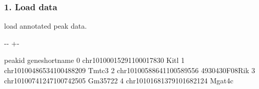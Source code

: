 \documentclass[letterpaper,10pt,english]{sphinxmanual}
\newlength\nbsphinxcodecellspacing
\begin{document}
\subsubsection{1. Load data}
\label{\detokenize{notebooks/02_motif_scan/02_atac_peaks_to_TFinfo_with_celloracle_190901:1.-Load-data}}
load annotated peak data.

{
%
\begin{sphinxVerbatim}[commandchars=\\\{\}]
\llap{\color{nbsphinxin}[4]:\,\hspace{\fboxrule}\hspace{\fboxsep}}  
\end{sphinxVerbatim}
}

{

\kern-\sphinxverbatimsmallskipamount\kern-\baselineskip
\kern+\FrameHeightAdjust\kern-\fboxrule
\vspace{\nbsphinxcodecellspacing}

%
\begin{sphinxVerbatim}[commandchars=\\\{\}]
\llap{\color{nbsphinxout}[4]:\,\hspace{\fboxrule}\hspace{\fboxsep}}                     peak\PYGZus{}id gene\PYGZus{}short\PYGZus{}name
0  chr10\PYGZus{}100015291\PYGZus{}100017830            Kitl
1  chr10\PYGZus{}100486534\PYGZus{}100488209           Tmtc3
2  chr10\PYGZus{}100588641\PYGZus{}100589556   4930430F08Rik
3  chr10\PYGZus{}100741247\PYGZus{}100742505         Gm35722
4  chr10\PYGZus{}101681379\PYGZus{}101682124          Mgat4c
\end{sphinxVerbatim}
}
\end{document}
